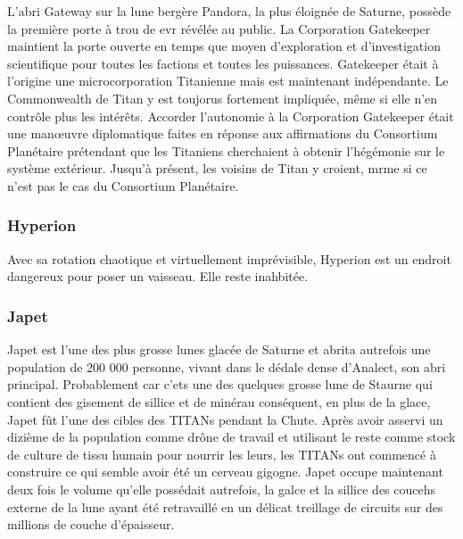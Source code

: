 L'abri Gateway sur la lune bergère Pandora, la plus éloignée de Saturne, possède la première porte à trou de evr révélée au public. La Corporation Gatekeeper maintient la porte ouverte en temps que moyen d'exploration et d'investigation scientifique pour toutes les factions et toutes les puissances. Gatekeeper était à l'origine une microcorporation Titanienne mais est maintenant indépendante. Le Commonwealth de Titan y est toujorus fortement impliquée, même si elle n'en contrôle plus les intérêts. Accorder l'autonomie à la Corporation Gatekeeper était une manœuvre diplomatique faites en réponse aux affirmations du Consortium Planétaire prétendant que les Titaniens cherchaient à obtenir l'hégémonie sur le système extérieur. Jusqu'à présent, les voisins de Titan y croient, mrme si ce n'est pas le cas du Consortium Planétaire. 

\subsubsection{Hyperion} \label{sec:hyperion} 

Avec sa rotation chaotique et virtuellement imprévisible, Hyperion est un endroit dangereux pour poser un vaisseau. Elle reste inahbitée. 

\subsubsection{Japet} \label{sec:iapetus} 

Japet est l'une des plus grosse lunes glacée de Saturne et abrita autrefois une population de 200 000 personne, vivant dans le dédale dense d'Analect, son abri principal. Probablement car c'ets une des quelques grosse lune de Staurne qui contient des gisement de sillice et de minérau conséquent, en plus de la glace, Japet fût l'une des cibles des TITANs pendant la Chute. Après avoir asservi un dizième de la population comme drône de travail et utilisant le reste comme stock de culture de tissu humain pour nourrir les leurs, les TITANs ont commencé à construire ce qui semble avoir été un cerveau gigogne. Japet occupe maintenant deux fois le volume qu'elle possédait autrefois, la galce et la sillice des coucehs externe de la lune ayant été retravaillé en un délicat treillage de circuits sur des millions de couche d'épaisseur. 

